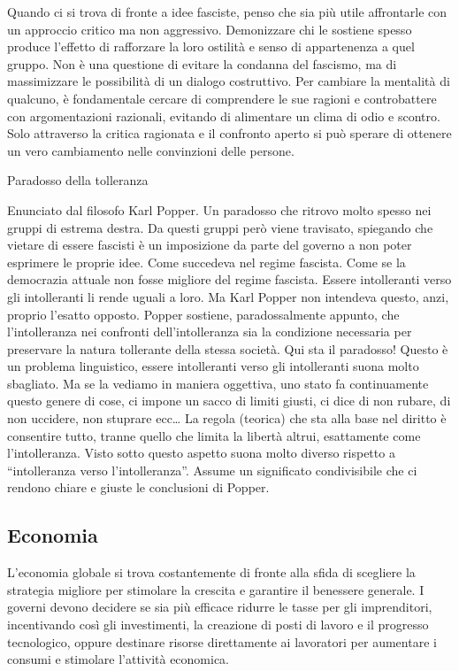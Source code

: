 \documentclass[12pt]{book} %
\begin{document}
\begin{mdframed}[linewidth=1pt]
Quando ci si trova di fronte a idee fasciste, penso che sia più utile affrontarle con un approccio critico ma non aggressivo. Demonizzare chi le sostiene spesso produce l'effetto di rafforzare la loro ostilità e senso di appartenenza a quel gruppo. Non è una questione di evitare la condanna del fascismo, ma di massimizzare le possibilità di un dialogo costruttivo. Per cambiare la mentalità di qualcuno, è fondamentale cercare di comprendere le sue ragioni e controbattere con argomentazioni razionali, evitando di alimentare un clima di odio e scontro. Solo attraverso la critica ragionata e il confronto aperto si può sperare di ottenere un vero cambiamento nelle convinzioni delle persone.
\end{mdframed}

\bigskip
\begin{mdframed}[linewidth=1pt]
Paradosso della tolleranza

Enunciato dal filosofo Karl Popper. Un paradosso che ritrovo molto spesso nei gruppi di estrema destra. Da questi
gruppi però viene travisato, spiegando che vietare di essere fascisti è un imposizione da parte del governo a non poter
esprimere le proprie idee. Come succedeva nel regime fascista. Come se la democrazia attuale non fosse migliore del
regime fascista. Essere intolleranti verso gli intolleranti li rende uguali a loro. Ma Karl Popper non intendeva
questo, anzi, proprio l'esatto opposto. Popper sostiene, paradossalmente appunto, che
l'intolleranza nei confronti dell'intolleranza sia la condizione necessaria per preservare la natura tollerante della
stessa società. Qui sta il paradosso! Questo è un problema linguistico, essere intolleranti verso gli intolleranti
suona molto sbagliato. Ma se la vediamo in maniera oggettiva, uno stato fa continuamente questo genere di cose, ci
impone un sacco di limiti giusti, ci dice di non rubare, di non uccidere, non stuprare ecc… La regola (teorica) che sta
alla base nel diritto è consentire tutto, tranne quello che limita la libertà altrui, esattamente come
l'intolleranza. Visto sotto questo aspetto suona molto diverso rispetto a “intolleranza verso
l'intolleranza”. Assume un significato condivisibile che ci rendono chiare e giuste le conclusioni
di Popper.
\end{mdframed}

\subsection{Economia}
L'economia globale si trova costantemente di fronte alla sfida di scegliere la strategia migliore per stimolare la crescita e garantire il benessere generale. I governi devono decidere se sia più efficace ridurre le tasse per gli imprenditori, incentivando così gli investimenti, la creazione di posti di lavoro e il progresso tecnologico, oppure destinare risorse direttamente ai lavoratori per aumentare i consumi e stimolare l'attività economica.
\end{document}
